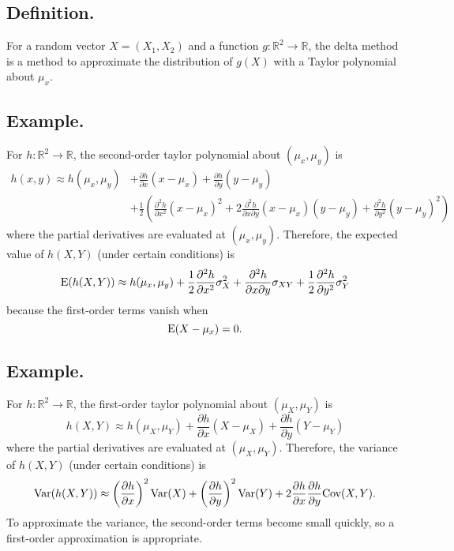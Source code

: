 \documentclass[titlepage]{article}
\begin{document}
\subsection{Definition.} For a random vector $X = (X_{1}, X_{2})$ and a function $g: \mathbb{R}^{2} \to \mathbb{R}$, the delta method is a method to approximate the distribution of $g(X)$ with a Taylor polynomial about $\mu_{x}$.

\subsection{Example.} For $h: \mathbb{R}^{2} \to \mathbb{R}$, the second-order taylor polynomial about $(\mu_{x}, \mu_{y})$ is
\begin{align*}
    h(x, y) \approx h(\mu_{x}, \mu_{y}) &+ \frac{\partial h}{\partial x}(x - \mu_{x}) + \frac{\partial h}{\partial y}(y - \mu_{y}) \\
                                        &+ \frac{1}{2}\left(\frac{\partial^{2} h}{\partial x^{2}}(x - \mu_{x})^{2} + 2\frac{\partial^{2} h}{\partial x \partial y}(x - \mu_{x})(y - \mu_{y}) + \frac{\partial^{2} h}{\partial y^{2}}(y - \mu_{y})^{2}\right)
\end{align*}
where the partial derivatives are evaluated at $(\mu_{x}, \mu_{y})$. Therefore, the expected value of $h(X, Y)$ (under certain conditions) is 
$$\text{E}(h(X, Y)) \approx h(\mu_{x}, \mu_{y}) + \frac{1}{2}\frac{\partial^{2} h}{\partial x^{2}}\sigma_{X}^{2} + \frac{\partial^{2} h}{\partial x \partial y}\sigma_{XY} + \frac{1}{2}\frac{\partial^{2} h}{\partial y^{2}}\sigma_{Y}^{2}$$
because the first-order terms vanish when 
$$\text{E}(X - \mu_{x}) = 0.$$

\subsection{Example.} For $h: \mathbb{R}^{2} \to \mathbb{R}$, the first-order taylor polynomial about $(\mu_{X}, \mu_{Y})$ is
$$h(X, Y) \approx h(\mu_{X}, \mu_{Y}) + \frac{\partial h}{\partial x}(X - \mu_{X}) + \frac{\partial h}{\partial y}(Y - \mu_{Y})$$
where the partial derivatives are evaluated at $(\mu_{X}, \mu_{Y})$. Therefore, the variance of $h(X, Y)$ (under certain conditions) is 
$$\text{Var}(h(X, Y)) \approx \left(\frac{\partial h}{\partial x}\right)^{2}\text{Var}(X) + \left(\frac{\partial h}{\partial y}\right)^{2}\text{Var}(Y) + 2\frac{\partial h}{\partial x}\frac{\partial h}{\partial y}\text{Cov}(X, Y).$$
To approximate the variance, the second-order terms become small quickly, so a first-order approximation is appropriate.
\end{document}
